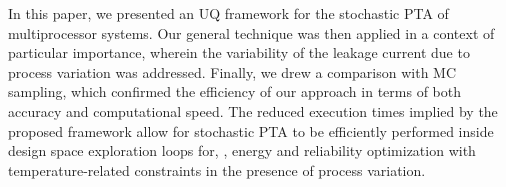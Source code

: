 In this paper, we presented an UQ framework for the stochastic PTA of multiprocessor systems. Our general technique was then applied in a context of particular importance, wherein the variability of the leakage current due to process variation was addressed. Finally, we drew a comparison with MC sampling, which confirmed the efficiency of our approach in terms of both accuracy and computational speed. The reduced execution times implied by the proposed framework allow for stochastic PTA to be efficiently performed inside design space exploration loops for, \eg, energy and reliability optimization with temperature-related constraints in the presence of process variation.
